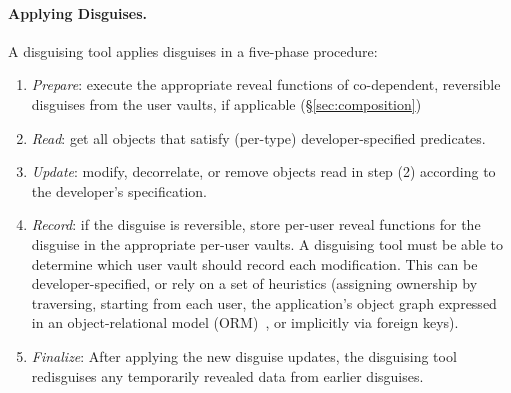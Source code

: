 \paragraph{Applying Disguises.}
A disguising tool applies disguises in a five-phase procedure:
\begin{enumerate}[nosep]
    \item \emph{Prepare}: execute the appropriate reveal functions of co-dependent,
        reversible disguises from the user vaults, if applicable (\S\ref{sec:composition})
        \item \emph{Read}: get all objects that satisfy (per-type) developer-specified predicates.
        \item \emph{Update}: modify, decorrelate, or remove objects read in step (2) according to the
        developer's specification.
    \item \emph{Record}: if the disguise is reversible, store per-user reveal functions for the
        disguise in the appropriate per-user vaults.
        A disguising tool must be able to determine which user vault should record each modification. This can be
        developer-specified, or rely on a set of heuristics (\eg assigning ownership by traversing,
        starting from each user, the application's object graph expressed in an object-relational
        model (ORM)~\cite{orm}, or implicitly via foreign keys).
        \item \emph{Finalize}: After applying the new disguise updates, the disguising tool
            redisguises any temporarily revealed data from earlier disguises.
\end{enumerate}

